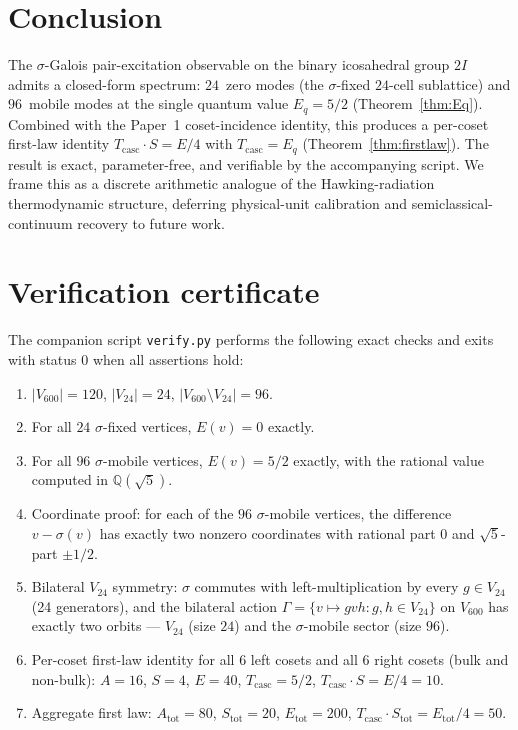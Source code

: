 \documentclass[11pt]{article}
\newcommand{\twoI}{2I}
\newcommand{\Vsixhundred}{V_{600}}
\newcommand{\Vtwentyfour}{V_{24}}
\newcommand{\sigmaG}{\sigma}
\newcommand{\Eq}{E_q}
\newcommand{\Tcasc}{T_{\mathrm{casc}}}
\begin{document}
\section{Conclusion}\label{sec:concl}

The $\sigmaG$-Galois pair-excitation observable on the binary
icosahedral group $\twoI$ admits a closed-form spectrum:
$24$~zero modes (the $\sigmaG$-fixed $24$-cell sublattice) and
$96$~mobile modes at the single quantum value $\Eq = 5/2$
(Theorem~\ref{thm:Eq}). Combined with the Paper~1 coset-incidence
identity, this produces a per-coset first-law identity
$\Tcasc \cdot S = E/4$ with $\Tcasc = \Eq$ (Theorem~\ref{thm:firstlaw}). The
result is exact, parameter-free, and verifiable by the accompanying
script. We frame this as a discrete arithmetic analogue of the
Hawking-radiation thermodynamic structure, deferring physical-unit
calibration and semiclassical-continuum recovery to future work.

\appendix

\section{Verification certificate}\label{app:verify}

The companion script \texttt{verify.py} performs the following exact
checks and exits with status $0$ when all assertions hold:
\begin{enumerate}
\item $|\Vsixhundred| = 120$, $|\Vtwentyfour| = 24$,
$|\Vsixhundred \setminus \Vtwentyfour| = 96$.
\item For all $24$ $\sigmaG$-fixed vertices, $E(v) = 0$ exactly.
\item For all $96$ $\sigmaG$-mobile vertices, $E(v) = 5/2$ exactly,
with the rational value computed in $\mathbb{Q}(\sqrt{5})$.
\item Coordinate proof: for each of the $96$ $\sigmaG$-mobile
vertices, the difference $v - \sigmaG(v)$ has exactly two nonzero
coordinates with rational part $0$ and $\sqrt{5}$-part $\pm 1/2$.
\item Bilateral $\Vtwentyfour$ symmetry: $\sigmaG$ commutes with
left-multiplication by every $g \in \Vtwentyfour$ (24 generators), and
the bilateral action $\Gamma = \{v \mapsto g v h : g, h \in \Vtwentyfour\}$
on $\Vsixhundred$ has exactly two orbits — $\Vtwentyfour$ (size $24$)
and the $\sigmaG$-mobile sector (size $96$).
\item Per-coset first-law identity for all $6$ left cosets and all $6$
right cosets (bulk and non-bulk): $A=16$, $S=4$, $E=40$, $\Tcasc = 5/2$,
$\Tcasc \cdot S = E/4 = 10$.
\item Aggregate first law: $A_{\mathrm{tot}} = 80$, $S_{\mathrm{tot}} = 20$,
$E_{\mathrm{tot}} = 200$, $\Tcasc \cdot S_{\mathrm{tot}} = E_{\mathrm{tot}}/4 = 50$.
\end{enumerate}
\end{document}
